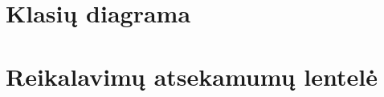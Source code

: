 \documentclass[a4paper,12pt]{article}
\begin{document}

\section{Klasių diagrama}


\section{Reikalavimų atsekamumų lentelė}
\end{document}
